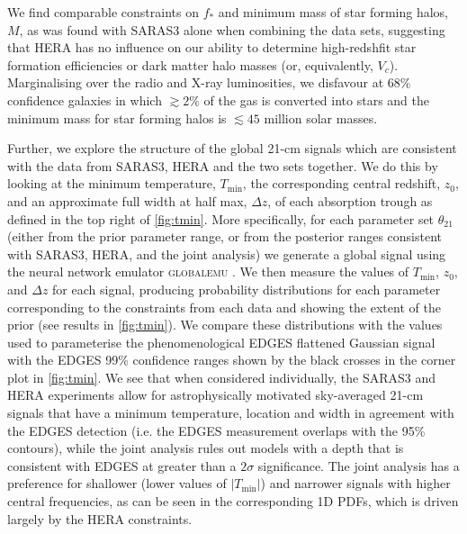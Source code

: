 We find comparable constraints on $f_*$ and minimum mass of star forming halos, $M$, as was found with SARAS3 alone \citep[\cref{ch:saras3},][]{Bevins_saras3_2022} when combining the data sets, suggesting that HERA has no influence on our ability to determine high-redshfit star formation efficiencies or dark matter halo masses (or, equivalently, $V_c$). Marginalising over the radio and X-ray luminosities, we disfavour at 68\% confidence galaxies in which $\gtrsim2\%$ of the gas is converted into stars and the minimum mass for star forming halos is $\lesssim 45$ million solar masses.

Further, we explore the structure of the global 21-cm signals which are consistent with the data from SARAS3, HERA and the two sets together. We do this by looking at  the minimum  temperature, $T_\mathrm{min}$, the  corresponding central redshift, $z_0$, and an approximate full width at half max, $\Delta z$, of each absorption trough as defined in the top right of \cref{fig:tmin}. More specifically, for each parameter set $\theta_{21}$ (either from the prior parameter range, or from the posterior ranges consistent with SARAS3, HERA, and the joint analysis) we generate a global signal using the  neural network emulator \textsc{globalemu} \citep[\cref{ch:globalemu},][]{Bevins_globalemu_2021}. We then measure the values of $T_\mathrm{min}$, $z_0$, and  $\Delta z$ for each signal, producing probability distributions for each parameter corresponding to the constraints from each data and showing the extent of the prior (see results in \cref{fig:tmin}). We compare these distributions with the values used to parameterise the phenomenological EDGES flattened Gaussian signal with the EDGES 99\% confidence ranges shown by the black crosses in the corner plot in \cref{fig:tmin}. We see that when considered individually, the SARAS3 and HERA experiments allow for astrophysically motivated sky-averaged 21-cm signals that have a minimum temperature, location and width in agreement with the EDGES detection (i.e. the EDGES measurement overlaps with the 95\% contours), while the joint analysis rules out models with a depth that is consistent with EDGES at greater than a $2\sigma$ significance. The joint analysis has a preference for shallower (lower values of $|T_\mathrm{min}|$) and narrower signals with higher central frequencies, as can be seen in the corresponding 1D PDFs, which is driven largely by the HERA constraints.

